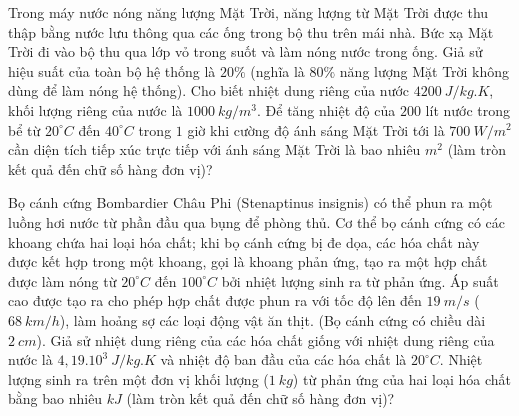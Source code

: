 \begin{ex}%
	
	Trong máy nước nóng năng lượng Mặt Trời, năng lượng từ Mặt Trời được thu thập bằng nước lưu thông qua các ống trong bộ thu trên mái nhà. Bức xạ Mặt Trời đi vào bộ thu qua lớp vỏ trong suốt và làm nóng nước trong ống. Giả sử hiệu suất của toàn bộ hệ thống là $20\% $ (nghĩa là $80\%$ năng lượng Mặt Trời không dùng để làm nóng hệ thống). Cho biết nhiệt dung riêng của nước $4200\ J/kg.K$, khối lượng riêng của nước là $1000\ kg/m^3$. Để tăng nhiệt độ của $200$ lít nước trong bể từ $20^{\circ}C$ đến $40^{\circ}C$ trong $1$ giờ khi cường độ ánh sáng Mặt Trời tới là $700\ W/m^2$ cần diện tích tiếp xúc trực tiếp với ánh sáng Mặt Trời là bao nhiêu $m^2$ (làm tròn kết quả đến chữ số hàng đơn vị)?
\end{ex}

\begin{ex}%
	Bọ cánh cứng Bombardier Châu Phi (Stenaptinus insignis) có thể phun ra một luồng hơi nước từ phần đầu qua bụng để phòng thủ. Cơ thể bọ cánh cứng có các khoang chứa hai loại hóa chất; khi bọ cánh cứng bị đe dọa, các hóa chất này được kết hợp trong một khoang, gọi là khoang phản ứng, tạo ra một hợp chất được làm nóng từ $20^\circ C$ đến $100^\circ C$ bởi nhiệt lượng sinh ra từ phản ứng. Áp suất cao được tạo ra cho phép hợp chất được phun ra với tốc độ lên đến $19\ m/s$ ($68\ km/h$), làm hoảng sợ các loại động vật ăn thịt. (Bọ cánh cứng có chiều dài $2\ cm$). Giả sử nhiệt dung riêng của các hóa chất giống với nhiệt dung riêng của nước là $4,19. 10^3\ J/kg.K$ và nhiệt độ ban đầu của các hóa chất là $20^\circ C$. Nhiệt lượng sinh ra trên một đơn vị khối lượng ($1\ kg$) từ phản ứng của hai loại hóa chất bằng bao nhiêu $kJ$ (làm tròn kết quả đến chữ số hàng đơn vị)?
\end{ex}

